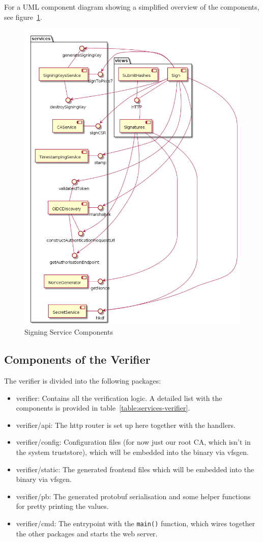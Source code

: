For a \gls{UML} component diagram showing a simplified overview of the components, see figure~\ref{fig:signingservicecomponents}.

\begin{figure}[H]
    \begin{center}
        \includegraphics[width=0.7\linewidth]{images/signing_service_components.png}
        \caption{Signing Service Components}
        \label{fig:signingservicecomponents}
    \end{center}
\end{figure}

\pagebreak

\subsection{Components of the Verifier}\label{subsec:modules-of-the-verifier}

The verifier is divided into the following packages:
\begin{itemize}
	\item verifier: Contains all the verification logic. A detailed list with the components is provided in table~\ref{table:services-verifier}.
	\item verifier/api: The http router is set up here together with the handlers.
	\item verifier/config: Configuration files (for now just our root \gls{CA}, which isn't in the system truststore), which will be embedded into the binary via vfsgen.
	\item verifier/static: The generated frontend files which will be embedded into the binary via vfsgen.
	\item verifier/pb: The generated protobuf serialisation and some helper functions for pretty printing the values.
	\item verifier/cmd: The entrypoint with the \texttt{main()} function, which wires together the other packages and starts the web server.
\end{itemize}


